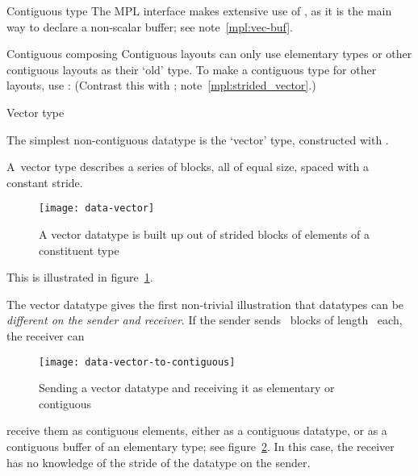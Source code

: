 


\begin{mplnote}{Contiguous type}
  The \ac{MPL} interface makes extensive use of
  ,
  as it is the main way to declare a non-scalar buffer;
  see note~\ref{mpl:vec-buf}.
\end{mplnote}

\begin{mplnote}{Contiguous composing}
  \label{mpl:cont_vector}
  Contiguous layouts can only use elementary types or other contiguous layouts
  as their `old' type.
  To make a contiguous type for other layouts, use :
  (Contrast this with ; note~\ref{mpl:strided_vector}.)
\end{mplnote}

 {Vector type}
\label{sec:data:vector}

The simplest non-contiguous datatype is the `vector' type, constructed with
.

A~vector type describes a series of blocks, all 
of equal size, spaced with a constant stride.
\begin{figure}[t]
  \texttt{[image: data-vector]}
  \caption{A vector datatype is built up out of strided blocks of elements of a constituent type}
  \label{fig:data-vector}
\end{figure}
This is illustrated in figure~\ref{fig:data-vector}.

The vector datatype gives the first non-trivial illustration that
datatypes can be \emph{different on the sender and
  receiver}. If the
sender sends ~blocks of length~ each, the receiver can
%
\begin{figure}[t]
  \texttt{[image: data-vector-to-contiguous]}
  \caption{Sending a vector datatype and receiving it as elementary or
    contiguous}
  \label{fig:data-vector-to-contiguous}
\end{figure}
%
receive them as  contiguous elements, either as a contiguous
datatype, or as a contiguous buffer of an elementary type; see
figure~\ref{fig:data-vector-to-contiguous}. In this case, the receiver
has no knowledge of the stride of the datatype on the sender.

